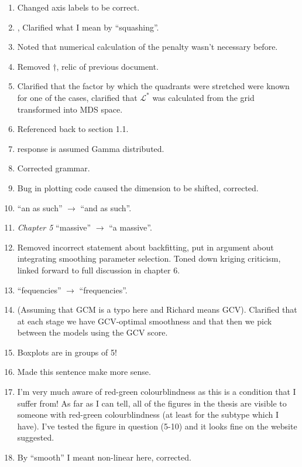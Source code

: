 \begin{enumerate}
\item {} Changed axis labels to be correct.
\item {},  Clarified what I mean by ``squashing''.
\item {} Noted that numerical calculation of the penalty wasn't necessary before.
\item {} Removed $\dagger$, relic of previous document.
\item {} Clarified that the factor by which the quadrants were stretched were known for one of the cases, clarified that $\mathcal{L}^*$ was calculated from the grid transformed into MDS space.
\item {} Referenced back to section 1.1.
\item {} response is assumed Gamma distributed.
\item {} Corrected grammar.
\item {} Bug in plotting code caused the dimension to be shifted, corrected.
\item {} ``an as such'' $\rightarrow$ ``and as such''.
\item {} \textit{Chapter 5} ``massive'' $\rightarrow$ ``a massive''.
\item {} Removed incorrect statement about backfitting, put in argument about integrating smoothing parameter selection. Toned down kriging criticism, linked forward to full discussion in chapter 6.
\item {} ``fequencies'' $\rightarrow$ ``frequencies''.
\item {} (Assuming that GCM is a typo here and Richard means GCV). Clarified that at each stage we have GCV-optimal smoothness and that then we pick between the models using the GCV score.
\item {} Boxplots are in groups of 5!
\item {} Made this sentence make more sense.
\item I'm very much aware of red-green colourblindness as this is a condition that I suffer from! As far as I can tell, all of the figures in the thesis are visible to someone with red-green colourblindness (at least for the subtype which I have). I've tested the figure in question (5-10) and it looks fine on the website suggested.
\item {} By ``smooth'' I meant non-linear here, corrected.

\end{enumerate}
